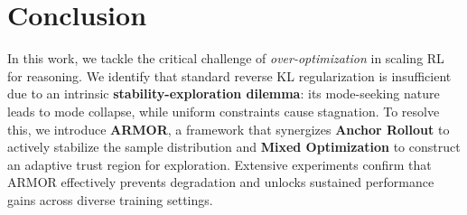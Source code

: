 \section{Conclusion}
In this work, we tackle the critical challenge of \textit{over-optimization} in scaling RL for reasoning.
We identify that standard reverse KL regularization is insufficient due to an intrinsic \textbf{stability-exploration dilemma}: its mode-seeking nature leads to mode collapse, while uniform constraints cause stagnation.
To resolve this, we introduce \textbf{ARMOR}, a framework that synergizes \textbf{Anchor Rollout} to actively stabilize the sample distribution and \textbf{Mixed Optimization} to construct an adaptive trust region for exploration.
Extensive experiments confirm that ARMOR effectively prevents degradation and unlocks sustained performance gains across diverse training settings.



